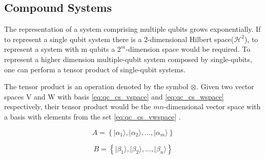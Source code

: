 \begin{comment}
Observables are deemed as the physical properties that can be measured. One way to think of them is to consider the 20 question game, where a two player game where one person thinks of an object and then the second person has a set of 20 "Yes" or "No" to discover the object, one observable could be "Is it red?". With each question the space comprising the possible answers will not increase, this means that asking two times in a row if the object is red in the game will always yield the same answer.
 
Hermitian operators are suitable for being used as observables, as their eigenvalues are real numbers.
The eigenvectors associated with the eigenvalues of the observable will correspond to the state in which the system will be after applying the Hermitian operator. Thus applying an observable to the system can be viewed as doing a projection of the system in the basis formed by the eigenvectors.  
\end{comment}

\subsection{Compound Systems}
\label{subsec:compound_systems}

The representation of a system comprising multiple qubits grows exponentially. If to represent a single qubit system there is a $2$-dimensional Hilbert space($\mathcal{H}^{2}$), to represent a system with m qubits a $2^m$-dimension space would be required. 
To represent a higher dimension multiple-qubit system composed by single-qubits, one can perform a tensor product of single-qubit systems.

The tensor product is an operation denoted by the symbol $\otimes$. 
Given two vector spaces V and W with basis 
\ref{eq:qc_cs_vspace} and \ref{eq:qc_cs_wspace}
respectively, their tensor product would be the $mn$-dimensional vector space with a basis with elements from the set \ref{eq:qc_cs_vwspace} \cite{Rieffel2011}.


\begin{equation}
\label{eq:qc_cs_vspace}
A = \left\{ \vert \alpha_{1} \rangle, \vert \alpha_{2} \rangle , ..., \vert \alpha_{m} \rangle \right\}
\end{equation} 

\begin{equation} 
\label{eq:qc_cs_wspace}
B = \left\{ \vert \beta_{1} \rangle, \vert \beta_{2} \rangle , ..., \vert \beta_{n} \rangle \right\}
\end{equation} 

